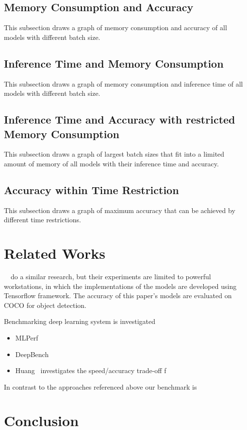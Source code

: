 \documentclass[conference]{IEEEtran}
\begin{document}
\subsection{Memory Consumption and Accuracy}
This subsection draws a graph of memory consumption and accuracy of all models with different batch size.

\subsection{Inference Time and Memory Consumption}
This subsection draws a graph of memory consumption and inference time of all models with different batch size.

\subsection{Inference Time and Accuracy with restricted Memory Consumption}
This subsection draws a graph of largest batch sizes that fit into a limited amount of memory of all models with their inference time and accuracy.

\subsection{Accuracy within Time Restriction}
This subsection draws a graph of maximum accuracy that can be achieved by different time restrictions. 

\section{Related Works}
~\cite{huang2017speed}~do a similar research, but their experiments are limited to powerful workstations, in which the implementations of the models are developed using Tensorflow framework. The accuracy of this paper's models are evaluated on COCO for object detection.

Benchmarking deep learning system is investigated

\begin{itemize}
    \item MLPerf
    \item DeepBench
    \item Huang~\cite{DBLP:journals/corr/HuangRSZKFFWSG016} investigates the speed/accuracy trade-off f
\end{itemize}

In contrast to the approaches referenced above our benchmark is 


\section{Conclusion}



%





\end{document}
